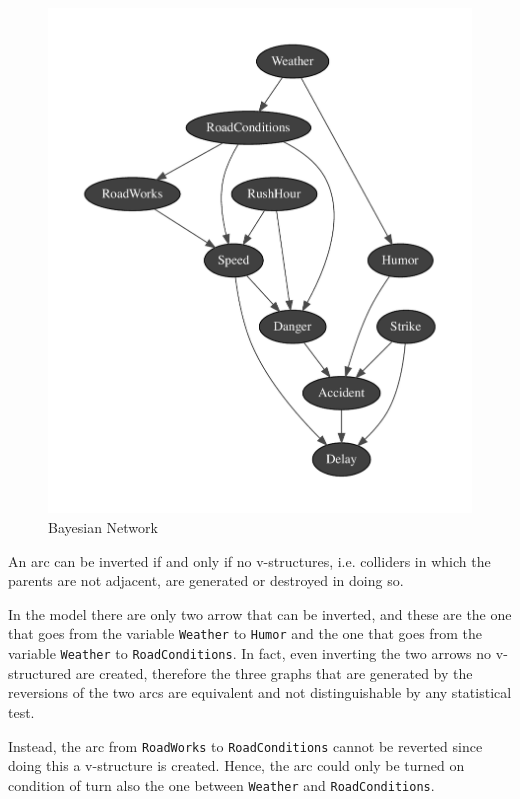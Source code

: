 \documentclass[a4paper,12pt]{article} %
\begin{document}
\begin{figure}[H]
	\centering
	\includegraphics[width=\linewidth]{../code/network.pdf}	
	\caption{Bayesian Network}
	\label{fig:net}
\end{figure}

An arc can be inverted if and only if no v-structures, i.e. colliders in which the parents are not adjacent, are generated or destroyed in doing so.
 
In the model there are only two arrow that can be inverted, and these are the one that goes from the variable \texttt{Weather} to \texttt{Humor} and the one that goes from the variable \texttt{Weather} to \texttt{RoadConditions}.
In fact, even inverting the two arrows no v-structured are created, therefore the three graphs that are generated by the reversions of the two arcs are equivalent and not distinguishable by any statistical test.

Instead, the arc from \texttt{RoadWorks} to \texttt{RoadConditions} cannot be reverted since doing this a v-structure is created. Hence, the arc could only be turned on condition of turn also the one between 
\texttt{Weather} and \texttt{RoadConditions}.
\end{document}
